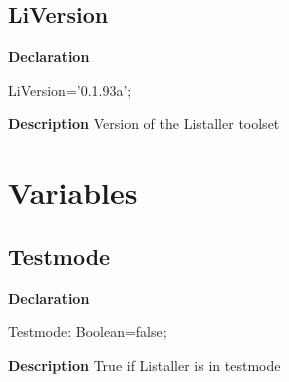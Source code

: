\documentclass{report}
\newif\ifpdf
\begin{document}
\subsection*{LiVersion}
\fi
\label{utilities-LiVersion}
\begin{list}{}{
\setlength{\itemindent}{0cm}
\setlength{\listparindent}{0cm}
\setlength{\leftmargin}{\evensidemargin}
\addtolength{\leftmargin}{\tmplength}
\settowidth{\labelsep}{X}
\addtolength{\leftmargin}{\labelsep}
\setlength{\labelwidth}{\tmplength}
}
\item[\textbf{Declaration}\hfill]
\ifpdf
\begin{flushleft}
\fi
\begin{ttfamily}
LiVersion='0.1.93a';\end{ttfamily}

\ifpdf
\end{flushleft}
\fi

\par
\item[\textbf{Description}]
Version of the Listaller toolset

\end{list}
\section{Variables}
\ifpdf
\subsection*{\large{\textbf{Testmode}}\normalsize\hspace{1ex}\hrulefill}
\else
\subsection*{Testmode}
\fi
\label{utilities-Testmode}
\begin{list}{}{
\setlength{\itemindent}{0cm}
\setlength{\listparindent}{0cm}
\setlength{\leftmargin}{\evensidemargin}
\addtolength{\leftmargin}{\tmplength}
\settowidth{\labelsep}{X}
\addtolength{\leftmargin}{\labelsep}
\setlength{\labelwidth}{\tmplength}
}
\item[\textbf{Declaration}\hfill]
\ifpdf
\begin{flushleft}
\fi
\begin{ttfamily}
Testmode: Boolean=false;\end{ttfamily}

\ifpdf
\end{flushleft}
\fi

\par
\item[\textbf{Description}]
True if Listaller is in testmode

\end{list}
\end{document}
